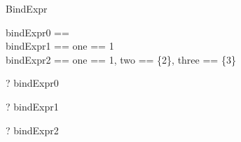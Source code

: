 \begin{zsection}
  \SECTION BindExpr
\end{zsection}

\begin{zed}
  bindExpr0 == \lblot \rblot\\
  bindExpr1 == \lblot one == 1 \rblot\\
  bindExpr2 == \lblot one == 1, two == \{2\}, three == \power \{3\} \rblot\\
\end{zed}

\begin{zed} \vdash? bindExpr0 \in [| true] \end{zed}
\begin{zed} \vdash? bindExpr1  \end{zed}
\begin{zed} 
  \vdash? bindExpr2 
\end{zed}
